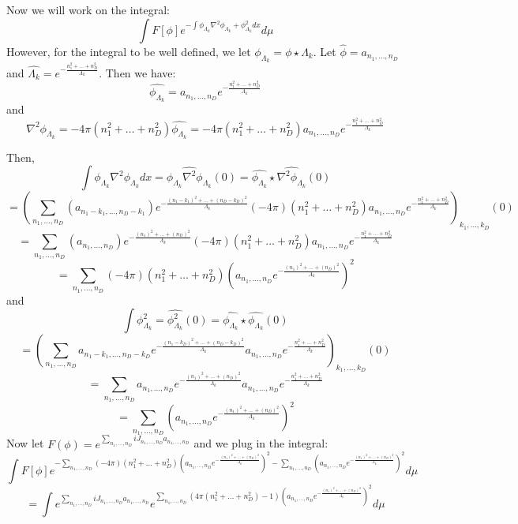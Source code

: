 \documentclass{article}
\theoremstyle{definition}
\begin{document}
Now we will work on the integral: 
$$\int F[\phi]e^{-\int \phi_{\Lambda_k} \nabla^2 \phi_{\Lambda_k} + \phi_{\Lambda_k}^2 dx}d\mu$$
However, for the integral to be well defined, we let $\phi_{\Lambda_k}=\phi \star {\Lambda_k}$. Let $\widehat{\phi}=a_{n_1,\ldots,n_D}$ and $\hat{\Lambda_k}=e^{-\frac{n_1^2+\ldots+n_D^2}{\Lambda_k}}$. Then we have: $$\widehat{\phi_{\Lambda_k}} = a_{n_1,\ldots,n_D}e^{-\frac{n_1^2+\ldots+n_D^2}{\Lambda_k}}$$ and 
$$
\widehat{\nabla^2 \phi_{\Lambda_k}} = -4\pi(n_1^2+\ldots+n_D^2)\widehat{\phi_{\Lambda_k}}= -4\pi(n_1^2+\ldots+n_D^2)a_{n_1,\ldots,n_D}e^{-\frac{n_1^2+\ldots+n_D^2}{\Lambda_k}}
$$



Then, $$\int \phi_{\Lambda_k} \nabla^2 \phi_{\Lambda_k}dx = \widehat{\phi_{\Lambda_k} \nabla^2 \phi_{\Lambda_k}}(0) = \widehat{\phi_{\Lambda_k}} \star \widehat{\nabla^2 \phi_{\Lambda_k}}(0)$$
$$
= \left(\sum_{n_1,\ldots,n_D} \left(a_{n_1-k_1,\ldots,n_D-k_1}\right)e^{-\frac{(n_1-k_1)^2+\ldots+(n_D-k_D)^2}{\Lambda_k}}(-4\pi)(n_1^2+\ldots+n_D^2)a_{n_1,\ldots,n_D}e^{-\frac{n_1^2+\ldots+n_D^2}{\Lambda_k}}\right)_{k_1,\ldots,k_D}(0)
$$
$$
=\sum_{n_1,\ldots,n_D} \left(a_{n_1,\ldots,n_D}\right)e^{-\frac{(n_1)^2+\ldots+(n_D)^2}{\Lambda_k}}(-4\pi)(n_1^2+\ldots+n_D^2)a_{n_1,\ldots,n_D}e^{-\frac{n_1^2+\ldots+n_D^2}{\Lambda_k}}
$$
$$
=\sum_{n_1,\ldots,n_D}
(-4\pi)(n_1^2+\ldots+n_D^2) \left(a_{n_1,\ldots,n_D} e^{-\frac{(n_1)^2+\ldots+(n_D)^2}{\Lambda_k}}\right)^2 
$$
and 
$$
\int \phi_{\Lambda_k}^2 = \widehat{\phi_{\Lambda_k}^2}(0)=\widehat{\phi_{\Lambda_k}}\star \widehat{\phi_{\Lambda_k}}(0)
$$
$$= 
\left(\sum_{n_1,\ldots,n_D} a_{n_1-k_1,\ldots,n_D-k_D}e^{-\frac{(n_1-k_D)^2+\ldots+(n_D-k_D)^2}{\Lambda_k}}a_{n_1,\ldots,n_D}e^{-\frac{n_1^2+\ldots+n_D^2}{\Lambda_k}}\right)_{k_1,\ldots,k_D}(0)
$$
$$= 
\sum_{n_1,\ldots,n_D} a_{n_1,\ldots,n_D}e^{-\frac{(n_1)^2+\ldots+(n_D)^2}{\Lambda_k}}a_{n_1,\ldots,n_D}e^{-\frac{n_1^2+\ldots+n_D^2}{\Lambda_k}}
$$
$$= 
\sum_{n_1,\ldots,n_D} \left(a_{n_1,\ldots,n_D}e^{-\frac{(n_1)^2+\ldots+(n_D)^2}{\Lambda_k}}\right)^2
$$
Now let $F(\phi) = e^{\sum_{n_1,\ldots,n_D}iJ_{n_1,\ldots,n_D} a_{n_1,\ldots,n_D}}$ and we plug in the integral:
$$
\int F[\phi]e^{-\sum_{n_1,\ldots,n_D}
(-4\pi)(n_1^2+\ldots+n_D^2) \left(a_{n_1,\ldots,n_D} e^{-\frac{(n_1)^2+\ldots+(n_D)^2}{\Lambda_k}}\right)^2  -\sum_{n_1,\ldots,n_D} \left(a_{n_1,\ldots,n_D}e^{-\frac{(n_1)^2+\ldots+(n_D)^2}{\Lambda_k}}\right)^2}d\mu
$$
$$
=\int e^{\sum_{n_1,\ldots,n_D}iJ_{n_1,\ldots,n_D} a_{n_1,\ldots,n_D}}e^{\sum_{n_1,\ldots,n_D}
\left(4\pi(n_1^2+\ldots+n_D^2)-1\right) \left(a_{n_1,\ldots,n_D} e^{-\frac{(n_1)^2+\ldots+(n_D)^2}{\Lambda_k}}\right)^2}d\mu
$$
\end{document}
